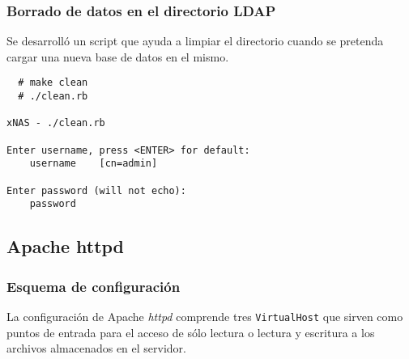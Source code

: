           \subsubsection {Borrado de datos en el directorio \textsc{LDAP}}

Se desarroll\'{o} un script que ayuda a limpiar el directorio cuando se pretenda cargar una nueva base de datos en el mismo.

{
\scriptsize
\linespread{1}
\begin{verbatim}
  # make clean
  # ./clean.rb

xNAS - ./clean.rb

Enter username, press <ENTER> for default:
    username	[cn=admin]

Enter password (will not echo):
    password

\end{verbatim}
}

      \subsection {Apache httpd}

        \subsubsection {Esquema de configuraci\'{o}n}

La configuraci\'{o}n de Apache \textit{httpd} comprende tres \texttt{VirtualHost} que sirven como puntos de entrada para el acceso de s\'{o}lo lectura o lectura y escritura a los archivos almacenados en el servidor.

{
 \begin{table}[H]
 \caption{VirtualHost configurados en Apache HTTPD}{}
 \label{tab:virtualhost}
 \noindent{} %
 \end{table}
}

